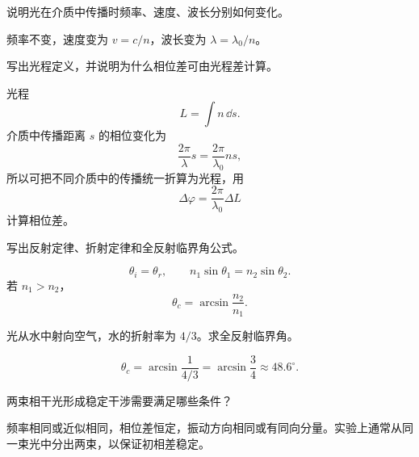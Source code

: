 %
%

\begin{exercise}[level=basic]
说明光在介质中传播时频率、速度、波长分别如何变化。
\begin{solution}
频率不变，速度变为 $v=c/n$，波长变为 $\lambda=\lambda_0/n$。
\end{solution}
\end{exercise}

\begin{exercise}[level=basic]
写出光程定义，并说明为什么相位差可由光程差计算。
\begin{solution}
光程
\[
  L=\int n\,\dd s.
\]
介质中传播距离 $s$ 的相位变化为
\[
  \frac{2\pi}{\lambda}s=\frac{2\pi}{\lambda_0}ns,
\]
所以可把不同介质中的传播统一折算为光程，用
\[
  \Delta\varphi=\frac{2\pi}{\lambda_0}\Delta L
\]
计算相位差。
\end{solution}
\end{exercise}

\begin{exercise}[level=basic]
写出反射定律、折射定律和全反射临界角公式。
\begin{solution}
\[
  \theta_i=\theta_r,\qquad n_1\sin\theta_1=n_2\sin\theta_2.
\]
若 $n_1>n_2$，
\[
  \theta_c=\arcsin\frac{n_2}{n_1}.
\]
\end{solution}
\end{exercise}

\begin{exercise}[level=standard]
光从水中射向空气，水的折射率为 $4/3$。求全反射临界角。
\begin{solution}
\[
  \theta_c=\arcsin\frac{1}{4/3}=\arcsin\frac34\approx48.6^\circ.
\]
\end{solution}
\end{exercise}

\begin{exercise}[level=basic]
两束相干光形成稳定干涉需要满足哪些条件？
\begin{solution}
频率相同或近似相同，相位差恒定，振动方向相同或有同向分量。实验上通常从同一束光中分出两束，以保证初相差稳定。
\end{solution}
\end{exercise}

